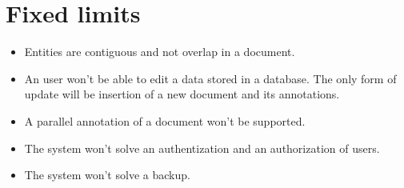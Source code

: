 \section{Fixed limits} 
\begin{itemize}
	\item Entities are contiguous and not overlap in a document.
	\item An user won't be able to edit a data stored in a database. The only form
	of update will be insertion of a new document and its annotations.
	\item A parallel annotation of a document won't be supported.
	\item The system won't solve an authentization and  an authorization of users.
	\item The system won't solve a backup.
\end{itemize}



